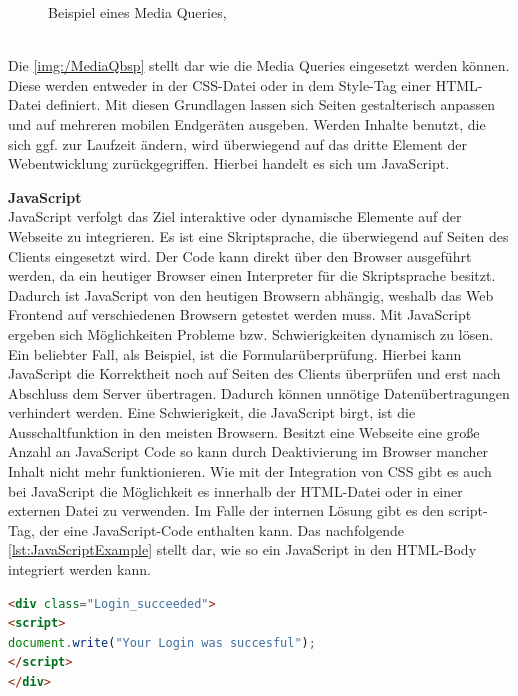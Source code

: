 \documentclass[a4paper,titlepage,halfparskip,12pt]{scrreprt}
\begin{document}
\begin{onehalfspacing}
\begin{figure}[h]
	\caption{Beispiel eines Media Queries, \cite{buhler2017html5}}
	\label{img:/MediaQbsp}
\end{figure}
\\Die \autoref{img:/MediaQbsp} stellt dar wie die Media Queries eingesetzt werden können. Diese werden entweder in der \ac{CSS}-Datei oder in dem Style-Tag einer \ac{HTML}-Datei definiert. Mit diesen Grundlagen lassen sich Seiten gestalterisch anpassen und auf mehreren mobilen Endgeräten ausgeben. Werden Inhalte benutzt, die sich ggf. zur Laufzeit ändern, wird überwiegend auf das dritte Element der Webentwicklung zurückgegriffen. Hierbei handelt es sich um JavaScript.\cite{buhler2017html5}

\textbf{JavaScript}\\
JavaScript verfolgt das Ziel interaktive oder dynamische Elemente auf der Webseite zu integrieren. Es ist eine Skriptsprache, die überwiegend auf Seiten des Clients eingesetzt wird. Der Code kann direkt über den Browser ausgeführt werden, da ein heutiger Browser einen Interpreter für die Skriptsprache besitzt. Dadurch ist JavaScript von den heutigen Browsern abhängig, weshalb das Web Frontend auf verschiedenen Browsern getestet werden muss. Mit JavaScript ergeben sich Möglichkeiten Probleme bzw. Schwierigkeiten dynamisch zu lösen. Ein beliebter Fall, als Beispiel, ist die Formularüberprüfung. Hierbei kann JavaScript die Korrektheit noch auf Seiten des Clients überprüfen und erst nach Abschluss dem Server übertragen. Dadurch können unnötige Datenübertragungen verhindert werden. Eine Schwierigkeit, die JavaScript birgt, ist die Ausschaltfunktion in den meisten Browsern. Besitzt eine Webseite eine große Anzahl an JavaScript Code so kann durch Deaktivierung im Browser mancher Inhalt nicht mehr funktionieren. Wie mit der Integration von \ac{CSS} gibt es auch bei JavaScript die Möglichkeit es innerhalb der \ac{HTML}-Datei oder in einer externen Datei zu verwenden. Im Falle der internen Lösung gibt es den script-Tag, der eine JavaScript-Code enthalten kann. Das nachfolgende \autoref{lst:JavaScriptExample} stellt dar, wie so ein JavaScript in den HTML-Body integriert werden kann.
\begin{lstlisting}[language=HTML,caption=Example Listing of JavaScript-Code,label={lst:JavaScriptExample}]
<div class="Login_succeeded">
<script>
document.write("Your Login was succesful");
</script>
</div>
\end{lstlisting}

\end{onehalfspacing}
\end{document}
